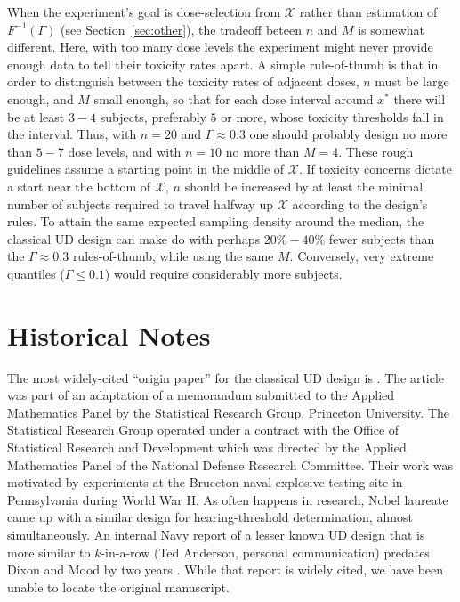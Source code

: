 When the experiment's goal is dose-selection from $\mathcal{X}$ rather than estimation of $F^{-1}(\Gamma)$ (see Section~\ref{sec:other}), the tradeoff beteen $n$ and $M$ is somewhat different. Here, with too many dose levels the experiment might never provide enough data to tell their toxicity rates apart. A simple rule-of-thumb is that in order to distinguish between the toxicity rates of adjacent doses, $n$ must be large enough, and $M$ small enough, so that for each dose interval around $x^*$ there will be at least $3-4$ subjects, preferably $5$ or more, whose toxicity thresholds fall in the interval.  Thus, with $n=20$ and $\Gamma\approx 0.3$ one should probably design no more than $5-7$ dose levels, and with $n=10$ no more than $M=4$. These rough guidelines assume a starting point in the middle of $\mathcal{X}$. If toxicity concerns dictate a start near the bottom of $\mathcal{X}$, $n$ should be increased by at least the minimal number of subjects required to travel halfway up $\mathcal{X}$ according to the design's rules. To attain the same expected sampling density around the median, the classical UD design can make do with perhaps $20\%-40\%$ fewer subjects than the $\Gamma\approx 0.3$ rules-of-thumb, while using the same $M$. Conversely, very extreme quantiles ($\Gamma\leq 0.1$) would require considerably more subjects.

\section{Historical Notes}\label{sec:history}

The most widely-cited ``origin paper'' for the classical UD design is \cite{Dixo:Mood:Amet:1948}. The article was part of an adaptation of a memorandum submitted to the Applied Mathematics Panel by the Statistical Research Group, Princeton University.  The Statistical Research Group operated under a contract with the Office of Statistical Research and Development which was directed by the Applied Mathematics Panel of the National Defense Research Committee.  Their work was motivated by experiments at the Bruceton naval explosive testing site in Pennsylvania during World War II. As often happens in research, Nobel laureate \cite{vonB:anew:1947} came up with a similar design for hearing-threshold determination, almost simultaneously.  An internal Navy report of a lesser known UD design that is more similar to $k$-in-a-row (Ted Anderson, personal communication) predates Dixon and Mood by two years  \citep{Ande:McCa:Tuke:Stai:1946}. While that report is widely cited, we have been unable to locate the original manuscript.

